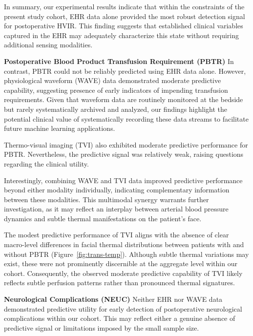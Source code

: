 In summary, our experimental results indicate that within the constraints of the present study cohort, EHR data alone provided the most robust detection signal for postoperative HVIR. This finding suggests that established clinical variables captured in the EHR may adequately characterize this state without requiring additional sensing modalities.

\vspace{1ex}
\noindent\textbf{Postoperative Blood Product Transfusion Requirement (PBTR)}
In contrast, PBTR could not be reliably predicted using EHR data alone. However, physiological waveform (WAVE) data demonstrated moderate predictive capability, suggesting presence of early indicators of impending transfusion requirements. Given that waveform data are routinely monitored at the bedside but rarely systematically archived and analyzed, our findings highlight the potential clinical value of systematically recording these data streams to facilitate future machine learning applications.

Thermo-visual imaging (TVI) also exhibited moderate predictive performance for PBTR. Nevertheless, the predictive signal was relatively weak, raising questions regarding the clinical utility.

Interestingly, combining WAVE and TVI data improved predictive performance beyond either modality individually, indicating complementary information between these modalities. This multimodal synergy warrants further investigation, as it may reflect an interplay between arterial blood pressure dynamics and subtle thermal manifestations on the patient's face.

The modest predictive performance of TVI aligns with the absence of clear macro-level differences in facial thermal distributions between patients with and without PBTR (Figure~\ref{fig:trans-temp}). Although subtle thermal variations may exist, these were not prominently discernible at the aggregate level within our cohort. Consequently, the observed moderate predictive capability of TVI likely reflects subtle perfusion patterns rather than pronounced thermal signatures.

\vspace{1ex}
\noindent\textbf{Neurological Complications (NEUC)}
Neither EHR nor WAVE data demonstrated predictive utility for early detection of postoperative neurological complications within our cohort. This may reflect either a genuine absence of predictive signal or limitations imposed by the small sample size.

